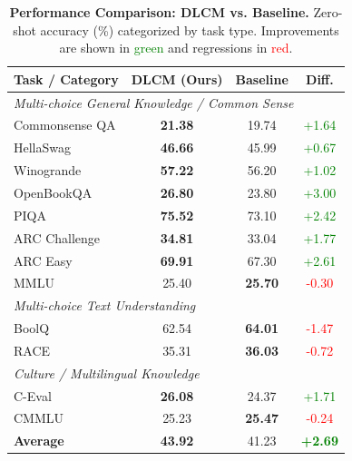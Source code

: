 



\begin{table}[htbp]
\centering
\caption{\textbf{Performance Comparison: DLCM vs. Baseline.} Zero-shot accuracy (\%) categorized by task type. Improvements are shown in \textcolor{green}{green} and regressions in \textcolor{red}{red}.}
\label{tab:categorized_comparison_step238000}
\renewcommand{\arraystretch}{1.2}
\setlength{\tabcolsep}{10pt}
\begin{tabular}{lccc}
\toprule
\rowcolor{gray!15}
\textbf{Task / Category} & \textbf{DLCM (Ours)} & \textbf{Baseline} & \textbf{Diff.} \\
\midrule
\multicolumn{4}{l}{\textit{Multi-choice General Knowledge / Common Sense}} \\

Commonsense QA  & \textbf{21.38} & 19.74 & \textcolor{green}{+1.64} \\
HellaSwag       & \textbf{46.66} & 45.99 & \textcolor{green}{+0.67} \\
Winogrande      & \textbf{57.22} & 56.20 & \textcolor{green}{+1.02} \\
OpenBookQA      & \textbf{26.80} & 23.80 & \textcolor{green}{+3.00} \\
PIQA            & \textbf{75.52} & 73.10 & \textcolor{green}{+2.42} \\
ARC Challenge   & \textbf{34.81} & 33.04 & \textcolor{green}{+1.77} \\
ARC Easy        & \textbf{69.91} & 67.30 & \textcolor{green}{+2.61} \\
MMLU            & 25.40 & \textbf{25.70} & \textcolor{red}{-0.30} \\
\midrule
\multicolumn{4}{l}{\textit{Multi-choice Text Understanding}} \\
BoolQ           & 62.54 & \textbf{64.01} & \textcolor{red}{-1.47} \\
RACE            & 35.31 & \textbf{36.03} & \textcolor{red}{-0.72} \\
\midrule
\multicolumn{4}{l}{\textit{Culture / Multilingual Knowledge}} \\
C-Eval          & \textbf{26.08} & 24.37 & \textcolor{green}{+1.71} \\
CMMLU           & 25.23 & \textbf{25.47} & \textcolor{red}{-0.24} \\
\midrule
\rowcolor{gray!15}
\textbf{Average} & \textbf{43.92} & 41.23 & \textcolor{green}{\textbf{+2.69}} \\
\bottomrule
\end{tabular}
\end{table}

